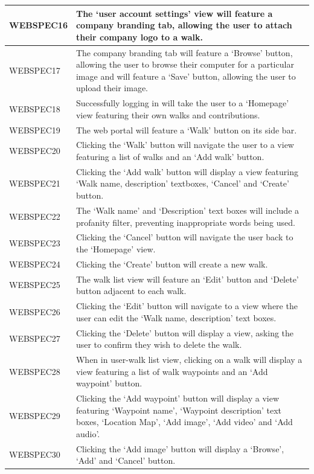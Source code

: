 \documentclass[11pt,a4paper]{article}
\begin{document}
\begin{longtable}{|p{2.5cm}p{13cm}|}
WEBSPEC16 & The `user account settings' view will feature a company branding tab, allowing the user to attach their company logo to a walk. \\ \hline
WEBSPEC17 & The company branding tab will feature a `Browse' button, allowing the user to browse their computer for a particular image and will feature a `Save' button, allowing the user to upload their image. \\ \hline
WEBSPEC18 & Successfully logging in will take the user to a `Homepage' view featuring their own walks and contributions. \\ \hline
WEBSPEC19 & The web portal will feature a `Walk' button on its side bar. \\ \hline
WEBSPEC20 & Clicking the `Walk' button will navigate the user to a view featuring a list of walks and an `Add walk' button. \\ \hline
WEBSPEC21 & Clicking the `Add walk' button will display a view featuring `Walk name, description' textboxes, `Cancel' and `Create' button. \\ \hline
WEBSPEC22 & The `Walk name' and `Description' text boxes will include a profanity filter, preventing inappropriate words being used. \\ \hline
WEBSPEC23 & Clicking the `Cancel' button will navigate the user back to the `Homepage' view. \\ \hline
WEBSPEC24 & Clicking the `Create' button will create a new walk. \\ \hline
WEBSPEC25 & The walk list view will feature an `Edit' button and `Delete' button adjacent to each walk. \\ \hline
WEBSPEC26 & Clicking the `Edit' button will navigate to a view where the user can edit the `Walk name, description' text boxes. \\ \hline
WEBSPEC27 & Clicking the `Delete' button will display a view, asking the user to confirm they wish to delete the walk. \\ \hline
WEBSPEC28 & When in user-walk list view, clicking on a walk will display a view featuring a list of walk waypoints and an `Add waypoint' button. \\ \hline
WEBSPEC29 & Clicking the `Add waypoint' button will display a view featuring `Waypoint name', `Waypoint description' text boxes, `Location Map', `Add image', `Add video' and `Add audio'. \\ \hline
WEBSPEC30 & Clicking the `Add image' button will display a `Browse', `Add' and `Cancel' button. \\ \hline

\end{longtable}
\end{document}
